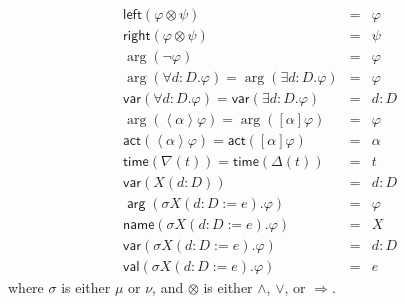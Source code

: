 \documentclass{article}
\begin{document}
\begin{equation*}
\begin{array}{lcl}
\mathsf{left}(\varphi \otimes \psi ) & = & \varphi \\
\mathsf{right}(\varphi \otimes \psi ) & = & \psi \\
\arg (\lnot \varphi ) & = & \varphi \\
\arg (\forall d:D.\varphi )=\arg (\exists d:D.\varphi ) & = & \varphi \\
\mathsf{var}(\forall d:D.\varphi )=\mathsf{var}(\exists d:D.\varphi ) & = &
d:D \\
\arg (\left\langle \alpha \right\rangle \varphi )=\arg ([\alpha ]\varphi ) &
= & \varphi \\
\mathsf{act}(\left\langle \alpha \right\rangle \varphi )=\mathsf{act}%
([\alpha ]\varphi ) & = & \alpha \\
\mathsf{time}(\nabla (t))=\mathsf{time}(\Delta (t)) & = & t \\
\mathsf{var}(X(d:D)) & = & d:D \\
\mathsf{\arg }(\sigma X(d:D:=e).\varphi ) & = & \varphi \\
\mathsf{name}(\sigma X(d:D:=e).\varphi ) & = & X \\
\mathsf{var}(\sigma X(d:D:=e).\varphi ) & = & d:D \\
\mathsf{val}(\sigma X(d:D:=e).\varphi ) & = & e%
\end{array}%
\end{equation*}%
where $\sigma $ is either $\mu $ or $\nu $, and $\otimes $ is either $\wedge
$, $\vee $, or $\Rightarrow $.
\end{document}
